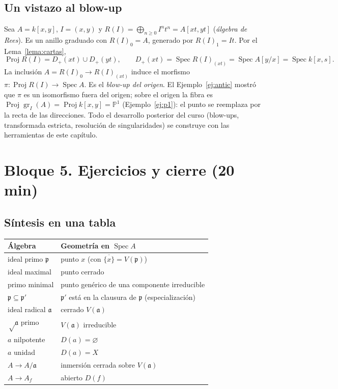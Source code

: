 \documentclass[11pt,a4paper]{article}
\newcommand{\Spec}{\operatorname{Spec}}
\newcommand{\Proj}{\operatorname{Proj}}
\newcommand{\gr}{\operatorname{gr}}
\newcommand{\PP}{\mathbb{P}}
\newcommand{\pp}{\mathfrak{p}}
\newcommand{\aaa}{\mathfrak{a}}
\theoremstyle{plain}
\theoremstyle{definition}
\theoremstyle{remark}
\newcounter{ej}
\begin{document}
\subsection{Un vistazo al blow-up}

Sea $A=k[x,y]$, $I=(x,y)$ y $R(I)=\bigoplus_{n\ge0}I^nt^n=A[xt,yt]$ (\emph{álgebra de Rees}). Es un anillo graduado con $R(I)_0=A$, generado por $R(I)_1=It$. Por el Lema~\ref{lema:cartas},
\[
\Proj R(I)=D_+(xt)\cup D_+(yt),\qquad D_+(xt)=\Spec R(I)_{(xt)}=\Spec A[y/x]=\Spec k[x,s].
\]
La inclusión $A=R(I)_0\to R(I)_{(xt)}$ induce el morfismo $\pi:\Proj R(I)\to\Spec A$. Es el \emph{blow-up del origen}. El Ejemplo~\ref{ej:antic} mostró que $\pi$ es un isomorfismo fuera del origen; sobre el origen la fibra es $\Proj\gr_I(A)=\Proj k[x,y]=\PP^1$ (Ejemplo~\ref{ej:p1}): el punto se reemplaza por la recta de las direcciones. Todo el desarrollo posterior del curso (blow-ups, transformada estricta, resolución de singularidades) se construye con las herramientas de este capítulo.

\section{Bloque 5. Ejercicios y cierre (20 min)}

\subsection*{Síntesis en una tabla}
\begin{center}
\begin{tabular}{@{}ll@{}}
\toprule
Álgebra & Geometría en $\Spec A$ \\
\midrule
ideal primo $\pp$ & punto $x$ (con $\overline{\{x\}}=V(\pp)$) \\
ideal maximal & punto cerrado \\
primo minimal & punto genérico de una componente irreducible \\
$\pp\subseteq\pp'$ & $\pp'$ está en la clausura de $\pp$ (especialización) \\
ideal radical $\aaa$ & cerrado $V(\aaa)$ \\
$\sqrt\aaa$ primo & $V(\aaa)$ irreducible \\
$a$ nilpotente & $D(a)=\varnothing$ \\
$a$ unidad & $D(a)=X$ \\
$A\to A/\aaa$ & inmersión cerrada sobre $V(\aaa)$ \\
$A\to A_f$ & abierto $D(f)$ \\
\bottomrule
\end{tabular}
\end{center}
\end{document}
